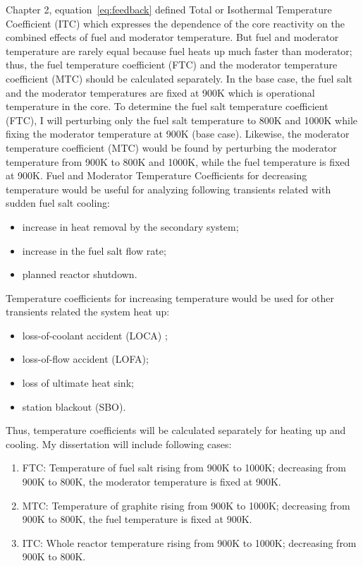 Chapter 2, equation~\ref{eq:feedback} defined Total or Isothermal Temperature 
Coefficient (ITC) which expresses the dependence of the core reactivity on the 
combined effects of fuel and moderator temperature. But fuel and moderator 
temperature are rarely equal because fuel heats up much faster than moderator; 
thus, the fuel temperature coefficient (FTC) and the moderator temperature 
coefficient (MTC) should be calculated separately. In the base 
case, the fuel salt and the moderator temperatures are fixed at 900K which is  
operational temperature in the core. To determine the fuel salt temperature 
coefficient (FTC), I will perturbing only the fuel salt temperature to 800K 
and 1000K while fixing the moderator temperature at 900K (base case).  
Likewise, the moderator temperature coefficient (MTC) would be found by 
perturbing the moderator temperature from 900K to 800K and 1000K, while the 
fuel temperature is fixed at 900K. Fuel and Moderator Temperature Coefficients 
for decreasing temperature would be useful for analyzing following transients 
related with sudden fuel salt cooling: 
\begin{itemize}
	\item increase in heat removal by the secondary system;
	\item increase in the fuel salt flow rate;
	\item planned reactor shutdown.
\end{itemize}
Temperature coefficients for increasing temperature would be used for other  
transients related the system heat up: 
\begin{itemize}
	\item loss-of-coolant accident (LOCA) ;
	\item loss-of-flow accident (LOFA);
	\item loss of ultimate heat sink;
	\item  station blackout (SBO).
\end{itemize}
Thus, temperature coefficients will be calculated separately for heating up 
and cooling. My dissertation will include following  cases: 
\begin{enumerate}
	\item FTC: Temperature of fuel salt rising from 900K to 1000K; decreasing 
	from 900K to 800K, the moderator temperature is fixed at 900K.
	\item MTC: Temperature of graphite rising from 900K to 1000K; decreasing 
	from 900K to 800K, the fuel temperature is fixed at 900K.
	\item ITC: Whole reactor temperature rising from 900K to 1000K; decreasing 
	from 900K to 800K.
\end{enumerate}
